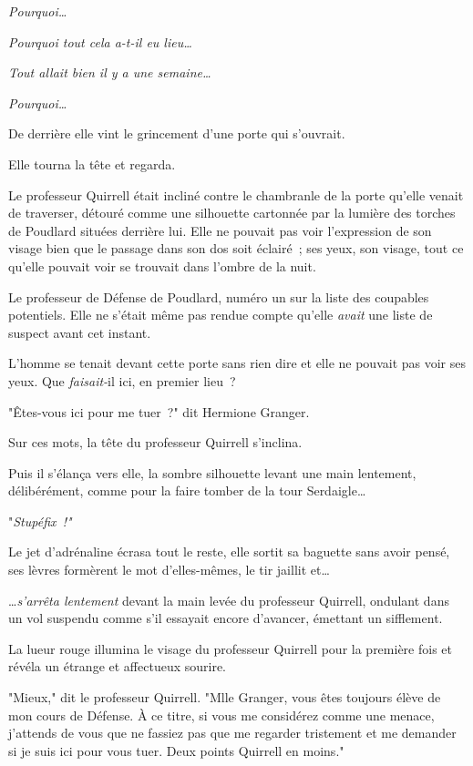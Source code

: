 \emph{Pourquoi…}

\emph{Pourquoi tout cela a-t-il eu lieu…}

\emph{Tout allait bien il y a une semaine…}

\emph{Pourquoi…}

De derrière elle vint le grincement d'une porte qui s'ouvrait.

Elle tourna la tête et regarda.

Le professeur Quirrell était incliné contre le chambranle de la porte qu'elle venait de traverser, détouré comme une silhouette cartonnée par la lumière des torches de Poudlard situées derrière lui. Elle ne pouvait pas voir l'expression de son visage bien que le passage dans son dos soit éclairé~; ses yeux, son visage, tout ce qu'elle pouvait voir se trouvait dans l'ombre de la nuit.

Le professeur de Défense de Poudlard, numéro un sur la liste des coupables potentiels. Elle ne s'était même pas rendue compte qu'elle \emph{avait} une liste de suspect avant cet instant.

L'homme se tenait devant cette porte sans rien dire et elle ne pouvait pas voir ses yeux. Que \emph{faisait-}il ici, en premier lieu~?

"Êtes-vous ici pour me tuer~?" dit Hermione Granger.

Sur ces mots, la tête du professeur Quirrell s'inclina.

Puis il s'élança vers elle, la sombre silhouette levant une main lentement, délibérément, comme pour la faire tomber de la tour Serdaigle…

"\emph{Stupéfix~!"}

Le jet d'adrénaline écrasa tout le reste, elle sortit sa baguette sans avoir pensé, ses lèvres formèrent le mot d'elles-mêmes, le tir jaillit et…

…\emph{s'arrêta lentement} devant la main levée du professeur Quirrell, ondulant dans un vol suspendu comme s'il essayait encore d'avancer, émettant un sifflement.

La lueur rouge illumina le visage du professeur Quirrell pour la première fois et révéla un étrange et affectueux sourire.

"Mieux," dit le professeur Quirrell. "Mlle Granger, vous êtes toujours élève de mon cours de Défense. À ce titre, si vous me considérez comme une menace, j'attends de vous que ne fassiez pas que me regarder tristement et me demander si je suis ici pour vous tuer. Deux points Quirrell en moins."

